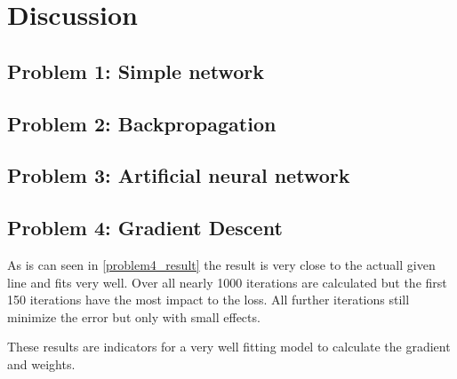 \chapter{Discussion}
\section{Problem 1: Simple network}
\section{Problem 2: Backpropagation}
\section{Problem 3: Artificial neural network}
\section{Problem 4: Gradient Descent}
As is can seen in \ref{problem4_result} the result is very close to the actuall given line and fits very well.
Over all nearly 1000 iterations are calculated but the first 150 iterations have the most impact to the loss.
All further iterations still minimize the error but only with small effects.

These results are indicators for a very well fitting model to calculate the gradient and weights.
